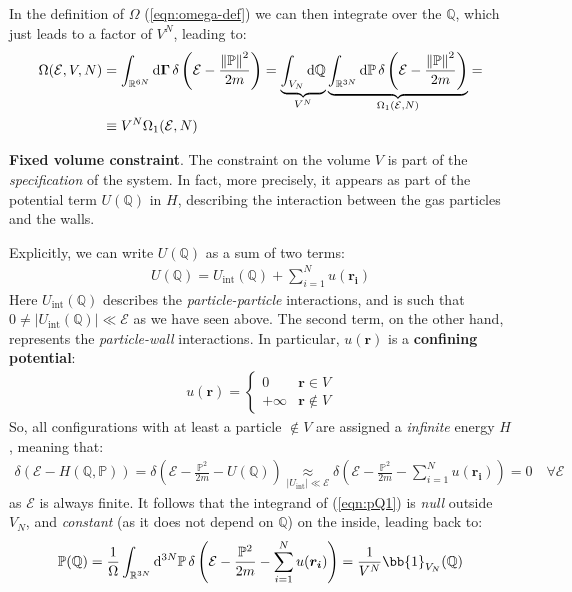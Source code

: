 \documentclass[../../main.tex]{subfiles}
\begin{document}
In the definition of $\Omega$ (\ref{eqn:omega-def}) we can then integrate over the $\mathbb{Q}$, which just leads to a factor of $V^N$, leading to: 
\begin{align}\nonumber
    \Omega(\mathcal{E}, V, N) &= \int_{\mathbb{R}^{6N}} \dd{\bm{\Gamma}} \delta\left(\mathcal{E}-\frac{\norm{\mathbb{P}}^2}{2m} \right) = \underbrace{\int_{V_N} \dd{\mathbb{Q}}}_{V^N} \underbrace{\int_{\mathbb{R}^{3N}} \dd{\mathbb{P}} \delta\left(\mathcal{E}- \frac{\norm{\mathbb{P}}^2}{2m} \right) }_{\Omega_1(\mathcal{E},N)}=\\
    & \equiv V^N \Omega_1(\mathcal{E}, N) \label{eqn:omega1-def}
\end{align}

\begin{appr}\textbf{Fixed volume constraint}. The constraint on the volume $V$ is part of the \textit{specification} of the system. In fact, more precisely, it appears as part of the potential term $U(\mathbb{Q})$ in $H$, describing the interaction between the gas particles and the walls.

Explicitly, we can write $U(\mathbb{Q})$ as a sum of two terms:
\begin{align*}
    U(\mathbb{Q}) = U_{\mathrm{int}}(\mathbb{Q}) + \sum_{i=1}^N u(\bm{r_i})
\end{align*}
Here $U_{\mathrm{int}}(\mathbb{Q})$ describes the \textit{particle-particle} interactions, and is such that $0 \neq |U_{\mathrm{int}}(\mathbb{Q})| \ll \mathcal{E}$ as we have seen above. The second term, on the other hand, represents the \textit{particle-wall} interactions. In particular, $u(\bm{r})$ is a \textbf{confining potential}:   
\begin{align*}
    u(\bm{r}) = \begin{cases}
        0 & \bm{r} \in V\\
        +\infty & \bm{r}\not\in V
    \end{cases}
\end{align*}
So, all configurations with at least a particle $\notin V$ are assigned a \textit{infinite} energy $H$, meaning that: 
\begin{align*}
    \delta(\mathcal{E}- H(\mathbb{Q},\mathbb{P})) = \delta\left(\mathcal{E}-\frac{\mathbb{P}^2}{2m} - U(\mathbb{Q}) \right) \underset{|U_{\mathrm{int} }| \ll \mathcal{E}}{\approx}  \delta\left(\mathcal{E}- \frac{\mathbb{P}^2}{2m} - \sum_{i=1}^N u(\bm{r_i}) \right) = 0 \quad \forall \mathcal{E}
\end{align*}
as $\mathcal{E}$ is always finite. It follows that the integrand of (\ref{eqn:pQ1}) is \textit{null} outside $V_N$, and \textit{constant} (as it does not depend on $\mathbb{Q}$) on the inside, leading back to:
\begin{align*}
    \mathbb{P}(\mathbb{Q}) = \frac{1}{\Omega} \int_{\mathbb{R}^{3N}} \dd[3N]{\mathbb{P}} \delta\left(\mathcal{E}- \frac{\mathbb{P}^2}{2m} - \sum_{i=1}^N u(\bm{r_i}) \right) = \frac{1}{V^N} \bb{1}_{V_N} (\mathbb{Q}) 
\end{align*}
\end{appr}
\end{document}
